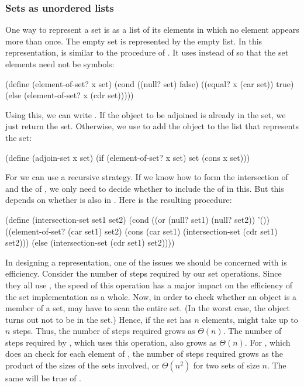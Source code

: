 \subsubsection*{Sets as unordered lists}

One way to represent a set is as a list of its elements in which no element
appears more than once.  The empty set is represented by the empty list.  In
this representation,  is similar to the procedure
 of .  It uses   instead of
 so that the set elements need not be symbols:

\begin{codeBlock}
(define (element-of-set? x set)
  (cond ((null? set) false)
        ((equal? x (car set)) true)
        (else (element-of-set? x (cdr set)))))
\end{codeBlock}

\noindent
Using this, we can write .  If the object to be adjoined is
already in the set, we just return the set.  Otherwise, we use  to
add the object to the list that represents the set:

\begin{codeBlock}
(define (adjoin-set x set)
  (if (element-of-set? x set)
      set
      (cons x set)))
\end{codeBlock}

\noindent
For  we can use a recursive strategy.  If we know how to
form the intersection of  and the  of , we only
need to decide whether to include the  of  in this.  But
this depends on whether  is also in .  Here is the
resulting procedure:

\begin{codeBlock}
(define (intersection-set set1 set2)
  (cond ((or (null? set1) (null? set2)) '())
        ((element-of-set? (car set1) set2)
         (cons (car set1) (intersection-set (cdr set1)
                                            set2)))
        (else (intersection-set (cdr set1) set2))))
\end{codeBlock}

\noindent
In designing a representation, one of the issues we should be concerned with is
efficiency.  Consider the number of steps required by our set operations.
Since they all use , the speed of this operation has a
major impact on the efficiency of the set implementation as a whole.  Now, in
order to check whether an object is a member of a set, 
may have to scan the entire set. (In the worst case, the object turns out not
to be in the set.)  Hence, if the set has \( n \) elements,
  might take up to \( n \) steps.  Thus, the number of
steps required grows as \( \Theta(n) \).  The number of steps required by
, which uses this operation, also grows as \( \Theta(n) \).
For , which does an  check for
each element of , the number of steps required grows as the product
of the sizes of the sets involved, or \( \Theta(n^2) \) for two sets of size
\( n \).  The same will be true of .

